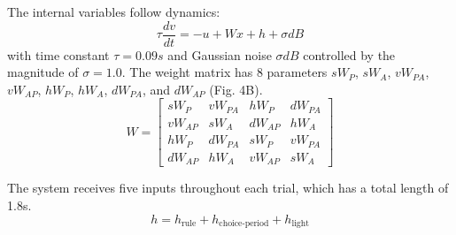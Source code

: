 \documentclass[11pt]{article}
\begin{document}
 The internal variables follow dynamics:
\begin{equation}
\tau \frac{dv}{dt} = -u + Wx + h + \sigma dB
\end{equation}
with time constant $\tau = 0.09s$ and Gaussian noise $\sigma dB$ controlled by the magnitude of $\sigma=1.0$.  The weight matrix has 8 parameters $sW_P$, $sW_A$, $vW_{PA}$, $vW_{AP}$, $hW_P$, $hW_A$, $dW_{PA}$, and $dW_{AP}$ (Fig. 4B).
\begin{equation}
W = \begin{bmatrix} sW_P & vW_{PA} & hW_P & dW_{PA}  \\ vW_{AP}  & sW_A & dW_{AP}  & hW_A \\ hW_P & dW_{PA}  & sW_P & vW_{PA}  \\ dW_{AP}  & hW_A & vW_{AP}  & sW_A \end{bmatrix}
\end{equation}

The system receives five inputs throughout each trial, which has a total length of 1.8s.
\begin{equation}
h = h_{\text{rule}} + h_{\text{choice-period}} + h_{\text{light}}
\end{equation}
\end{document}
